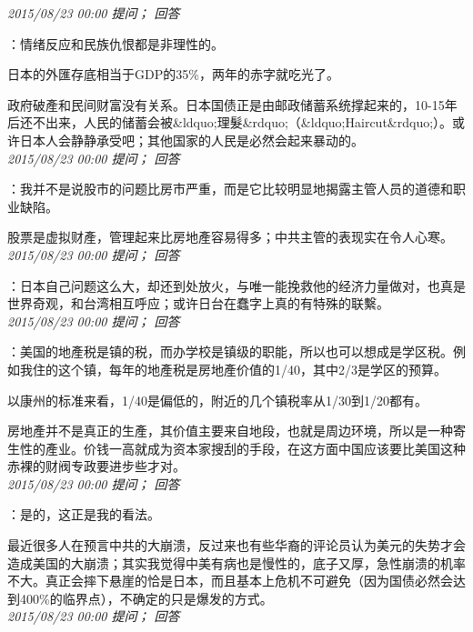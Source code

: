 \documentclass[twocolumn]{ctexart}
\begin{document}
\textit{\hfill\noindent\small 2015/08/23 00:00 提问； 回答}

：情绪反应和民族仇恨都是非理性的。

日本的外匯存底相当于GDP的35\%，两年的赤字就吃光了。

政府破產和民间财富没有关系。日本国债正是由邮政储蓄系统撑起来的，10-15年后还不出来，人民的储蓄会被\&ldquo;理髮\&rdquo;（\&ldquo;Haircut\&rdquo;）。或许日本人会静静承受吧；其他国家的人民是必然会起来暴动的。\\

\textit{\hfill\noindent\small 2015/08/23 00:00 提问； 回答}

：我并不是说股市的问题比房市严重，而是它比较明显地揭露主管人员的道德和职业缺陷。

股票是虚拟财產，管理起来比房地產容易得多；中共主管的表现实在令人心寒。\\

\textit{\hfill\noindent\small 2015/08/23 00:00 提问； 回答}

：日本自己问题这么大，却还到处放火，与唯一能挽救他的经济力量做对，也真是世界奇观，和台湾相互呼应；或许日台在蠢字上真的有特殊的联繫。\\

\textit{\hfill\noindent\small 2015/08/23 00:00 提问； 回答}

：美国的地產税是镇的税，而办学校是镇级的职能，所以也可以想成是学区税。例如我住的这个镇，每年的地產税是房地產价值的1/40，其中2/3是学区的预算。

以康州的标准来看，1/40是偏低的，附近的几个镇税率从1/30到1/20都有。

房地產并不是真正的生產，其价值主要来自地段，也就是周边环境，所以是一种寄生性的產业。价钱一高就成为资本家搜刮的手段，在这方面中国应该要比美国这种赤裸的财阀专政要进步些才对。\\

\textit{\hfill\noindent\small 2015/08/23 00:00 提问； 回答}

：是的，这正是我的看法。

最近很多人在预言中共的大崩溃，反过来也有些华裔的评论员认为美元的失势才会造成美国的大崩溃；其实我觉得中美有病也是慢性的，底子又厚，急性崩溃的机率不大。真正会摔下悬崖的恰是日本，而且基本上危机不可避免（因为国债必然会达到400\%的临界点），不确定的只是爆发的方式。\\

\textit{\hfill\noindent\small 2015/08/23 00:00 提问； 回答}
\end{document}
